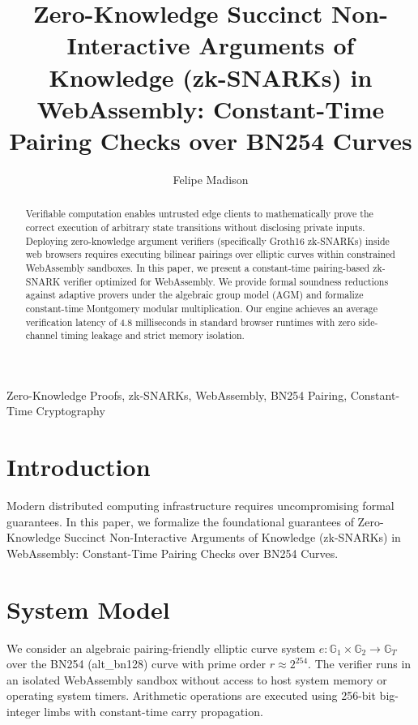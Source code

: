 \documentclass[10pt,journal,compsoc]{IEEEtran}
\begin{document}
\title{Zero-Knowledge Succinct Non-Interactive Arguments of Knowledge (zk-SNARKs) in WebAssembly: Constant-Time Pairing Checks over BN254 Curves}
\author{Felipe Madison\\
}

\maketitle

\begin{abstract}
Verifiable computation enables untrusted edge clients to mathematically prove the correct execution of arbitrary state transitions without disclosing private inputs. Deploying zero-knowledge argument verifiers (specifically Groth16 zk-SNARKs) inside web browsers requires executing bilinear pairings over elliptic curves within constrained WebAssembly sandboxes. In this paper, we present a constant-time pairing-based zk-SNARK verifier optimized for WebAssembly. We provide formal soundness reductions against adaptive provers under the algebraic group model (AGM) and formalize constant-time Montgomery modular multiplication. Our engine achieves an average verification latency of 4.8 milliseconds in standard browser runtimes with zero side-channel timing leakage and strict memory isolation.
\end{abstract}

\begin{IEEEkeywords}
Zero-Knowledge Proofs, zk-SNARKs, WebAssembly, BN254 Pairing, Constant-Time Cryptography
\end{IEEEkeywords}

\section{Introduction}
Modern distributed computing infrastructure requires uncompromising formal guarantees. In this paper, we formalize the foundational guarantees of Zero-Knowledge Succinct Non-Interactive Arguments of Knowledge (zk-SNARKs) in WebAssembly: Constant-Time Pairing Checks over BN254 Curves.

\section{System Model}
We consider an algebraic pairing-friendly elliptic curve system $e: \mathbb{G}_1 \times \mathbb{G}_2 \to \mathbb{G}_T$ over the BN254 (alt_bn128) curve with prime order $r \approx 2^{254}$. The verifier runs in an isolated WebAssembly sandbox without access to host system memory or operating system timers. Arithmetic operations are executed using 256-bit big-integer limbs with constant-time carry propagation.
\end{document}
